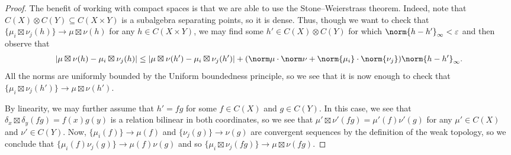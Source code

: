 \documentclass[../notes.tex]{subfiles}
\begin{document}
\begin{proof}
	The benefit of working with compact spaces is that we are able to use the Stone--Weierstrass theorem. Indeed, note that $C(X)\otimes C(Y)\subseteq C(X\times Y)$ is a subalgebra separating points, so it is dense. Thus, though we want to check that $\{\mu_i\boxtimes\nu_j(h)\}\to\mu\boxtimes\nu(h)$ for any $h\in C(X\times Y)$, we may find some $h'\in C(X)\otimes C(Y)$ for which $\norm{h-h'}_\infty<\varepsilon$ and then observe that
	\[\left|\mu\boxtimes\nu(h)-\mu_i\boxtimes\nu_j(h)\right|\le\left|\mu\boxtimes\nu(h')-\mu_i\boxtimes\nu_j(h')\right|+(\norm\mu\cdot\norm\nu+\norm{\mu_i}\cdot\norm{\nu_j})\norm{h-h'}_\infty.\]
	All the norms are uniformly bounded by the Uniform boundedness principle, so we see that it is now enough to check that $\{\mu_i\boxtimes\nu_j(h')\}\to\mu\boxtimes\nu(h')$.
	
	By linearity, we may further assume that $h'=fg$ for some $f\in C(X)$ and $g\in C(Y)$. In this case, we see that $\delta_x\boxtimes\delta_y(fg)=f(x)g(y)$ is a relation bilinear in both coordinates, so we see that $\mu'\boxtimes\nu'(fg)=\mu'(f)\nu'(g)$ for any $\mu'\in C(X)$ and $\nu'\in C(Y)$. Now, $\{\mu_i(f)\}\to\mu(f)$ and $\{\nu_j(g)\}\to\nu(g)$ are convergent sequences by the definition of the weak topology, so we conclude that $\{\mu_i(f)\nu_j(g)\}\to\mu(f)\nu(g)$ and so $\{\mu_i\boxtimes\nu_j(fg)\}\to\mu\boxtimes\nu(fg)$.

\end{proof}
\end{document}
